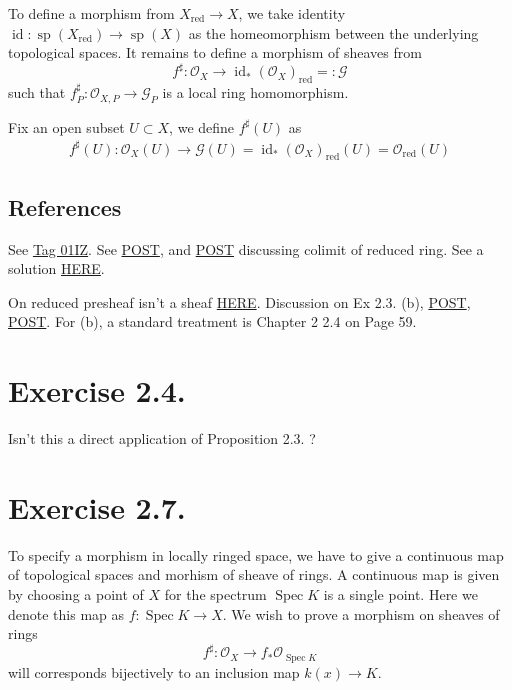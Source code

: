 To define a morphism from $X_{\text{red}}\to X$, we take identity $\operatorname{id}:\operatorname{sp}(X_{\text{red}})\to\operatorname{sp}(X)$ as the homeomorphism between the underlying topological spaces. It remains to define a morphism of sheaves from 
\[f^{\sharp}:\mathcal O_X\to\operatorname{id}_{\ast}(\mathcal O_X)_{\text{red}}=:\mathcal G\] such that $f^{\sharp}_P:\mathcal O_{X,P}\to \mathcal G_P$ is a local ring homomorphism. 

Fix an open subset $U\subset X$, we define $f^{\sharp}(U)$ as 
\begin{align*}
    f^{\sharp}(U):\mathcal O_X(U)\to\mathcal G(U)=\operatorname{id}_{\ast}(\mathcal O_X)_{\text{red}}(U)=\mathcal O_{\text{red}}(U)
\end{align*}

\subsection{References}
See \href{https://stacks.math.columbia.edu/tag/01IZ}{Tag 01IZ}. See \href{https://math.stackexchange.com/questions/437227/colimit-of-reduced-rings}{POST}, and \href{https://math.stackexchange.com/questions/2737301/reducedness-and-colimit}{POST} discussing colimit of reduced ring. See a solution \href{https://www.math.ncku.edu.tw/~fjmliou/alg/reduced_scheme.pdf}{HERE}.

On reduced presheaf isn't a sheaf \href{https://math.stackexchange.com/questions/338185/the-reduced-presheaf}{HERE}. Discussion on Ex 2.3. (b), \href{https://math.stackexchange.com/questions/682230/exercise-2-3-from-hartshornes-algebraic-geometry}{POST}, \href{https://math.stackexchange.com/questions/441031/reduced-schemes-and-global-sections}{POST}. For (b), a standard treatment is \cite{qing2006algebraic} Chapter 2 2.4 on Page 59.

\section{Exercise 2.4.}

Isn't this a direct application of Proposition 2.3. \cite{hartshorne2013algebraic}? 

\section{Exercise 2.7.}

To specify a morphism in locally ringed space, we have to give a continuous map of topological spaces and morhism of sheave of rings. A continuous map is given by choosing a point of $X$ for the spectrum $\operatorname{Spec}K$ is a single point. Here we denote this map as $f:\operatorname{Spec}K\to X$. We wish to prove a morphism on sheaves of rings 
\[f^{\sharp}:\mathscr O_{X}\to f_{\ast}\mathscr O_{\operatorname{Spec}K}\] will corresponds bijectively to an inclusion map $k(x)\to K$.  

